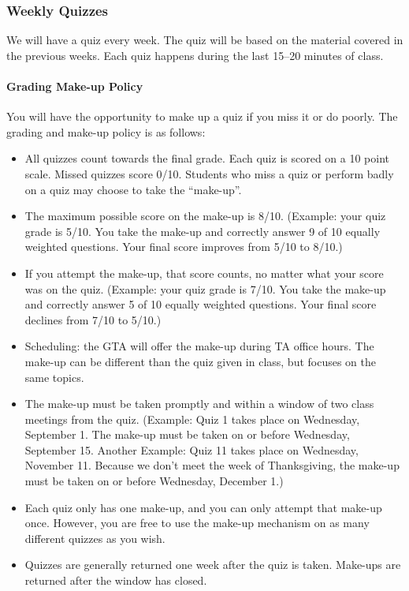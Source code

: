 \documentclass[11pt]{article}
\begin{document}
\subsubsection{Weekly Quizzes}\label{weekly-quizzes}

We will have a quiz every week. The quiz will be based on the material covered in the previous weeks.
Each quiz happens during the last 15--20 minutes of class.


\paragraph{Grading Make-up Policy} You will have the opportunity to make up a quiz if you miss it or do poorly. The grading and make-up policy is as follows:

\begin{itemize}
\item
  All quizzes count towards the final grade. Each quiz is scored on a 10
  point scale. Missed quizzes score 0/10. Students who miss a quiz or
  perform badly on a quiz may choose to take the ``make-up''.
\item
  The maximum possible score on the make-up is 8/10. (Example: your quiz
  grade is 5/10. You take the make-up and correctly answer 9 of 10
  equally weighted questions. Your final score improves from 5/10 to
  8/10.)
\item
  If you attempt the make-up, that score counts, no matter what your
  score was on the quiz. (Example: your quiz grade is 7/10. You take the
  make-up and correctly answer 5 of 10 equally weighted questions. Your
  final score declines from 7/10 to 5/10.)
\item
  Scheduling: the GTA will offer the make-up during TA office hours. The
  make-up can be different than the quiz given in class, but focuses on
  the same topics.
\item
  The make-up must be taken promptly and within a window of two class
  meetings from the quiz. (Example: Quiz 1 takes place on Wednesday,
  September 1. The make-up must be taken on or before Wednesday,
  September 15. Another Example: Quiz 11 takes place on Wednesday,
  November 11. Because we don't meet the week of
  Thanksgiving, the make-up must be taken on or before Wednesday,
  December 1.)
\item
  Each quiz only has one make-up, and you can only attempt that make-up
  once. However, you are free to use the make-up mechanism on as many
  different quizzes as you wish.
\item
  Quizzes are generally returned one week after the quiz is taken.
  Make-ups are returned after the window has closed.
\end{itemize}
\end{document}
